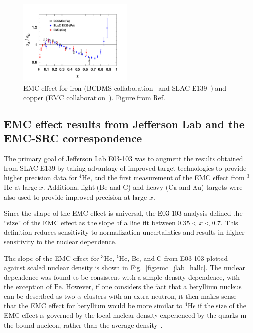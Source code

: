 \begin{figure}[htb]
  \includegraphics[width=0.5\textwidth]{plots/emc_cu_fe.pdf}
  \caption{EMC effect for iron (BCDMS collaboration~\cite{Benvenuti:1987az} and SLAC E139~\cite{Gomez:1993ri})
    and copper (EMC collaboration~\cite{Ashman:1992kv}).
    Figure from Ref.~\cite{Guzey:2012yk}}
  \label{fig:emc_iron}
\end{figure}

\subsection{EMC effect results from Jefferson Lab and the EMC-SRC correspondence}

The primary goal of Jefferson Lab E03-103 was to augment the results obtained from SLAC E139 by taking
advantage of improved target technologies to provide higher precision data for $^4$He, and the first
measurement of the EMC effect from $^3$He at large $x$.  Additional light (Be and C) and heavy (Cu and Au)
targets were also used to provide improved precision at large $x$.

Since the shape of the EMC effect is universal, the E03-103 analysis defined the ``size'' of the EMC
effect as the slope of a line fit between $0.35<x<0.7$.  This definition reduces sensitivity to
normalization uncertainties and results in higher sensitivity to the nuclear dependence.

The slope of the EMC effect for $^3$He, $^4$He, Be, and C from E03-103 plotted against scaled nuclear
density is shown in Fig.~\ref{fig:emc_jlab_hallc}.  The nuclear dependence was found to be consistent
with a simple density dependence, with the exception of Be. However, if one considers the fact that a
beryllium nucleus can be described as two $\alpha$ clusters with an extra neutron, it then makes sense
that the EMC effect for beryllium would be more similar to $^4$He if the size of the EMC effect is
governed by the local nuclear density experienced by the quarks in the bound nucleon, rather than the
average density~\cite{Seely:2009gt}.

